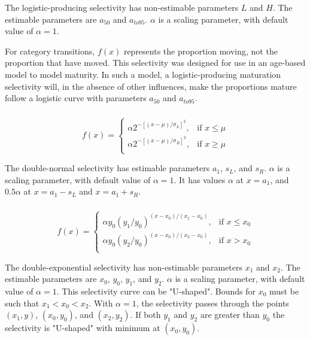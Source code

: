 The logistic-producing selectivity has non-estimable parameters $L$ and $H$. The estimable parameters are $a_{50}$ and $a_{to95}$. $\alpha$ is a scaling parameter, with default value of $\alpha = 1$.

For category transitions, $f(x)$ represents the proportion moving, not the proportion that have moved. This selectivity was designed for use in an age-based model to model maturity. In such a model, a logistic-producing maturation selectivity will, in the absence of other influences, make the proportions mature follow a logistic curve with parameters $a_{50}$ and $a_{to95}$.

\subsubsection[Double-normal]{}

\begin{equation}
  f(x) = \begin{cases}
    \alpha 2^{-[(x- \mu)/\sigma_L ]^2}, & \text{if $x \leq \mu$} \\
    \alpha 2^{-[(x- \mu)/\sigma_R ]^2}, & \text{if $x \ge \mu$}\\
  \end{cases}
\end{equation}

The double-normal selectivity has estimable parameters $a_1$, $s_L$, and $s_R$. $\alpha$ is a scaling parameter, with default value of $\alpha = 1$. It has values $\alpha$ at $x=a_1$, and $0.5 \alpha$ at $x=a_1-s_L$ and $x=a_1+s_R$.

\subsubsection[Double-exponential]{}

\begin{equation}
f(x)=\begin{cases}
	  \alpha y_0(y_1 / y_0)^{(x-x_0)/(x_1-x_0)}, & \text{if $x \le x_0$} \\
	  \alpha y_0(y_2 / y_0)^{(x-x_0)/(x_2-x_0)}, & \text{if $x > x_0$} \\
  \end{cases}
\end{equation}

The double-exponential selectivity has non-estimable parameters $x_1$ and $x_2$. The estimable parameters are $x_0$, $y_0$, $y_1$, and $y_2$.  $\alpha$ is a scaling parameter, with default value of $\alpha = 1$. This selectivity curve can be "U-shaped". Bounds for $x_0$ must be such that $x_1 < x_0 < x_2$. With $\alpha=1$, the selectivity passes through the points $(x_1, y)$, $(x_0, y_0)$, and $(x_2, y_2)$. If both $y_1$ and $y_2$ are greater than $y_0$ the selectivity is "U-shaped" with minimum at $(x_0, y_0)$.

